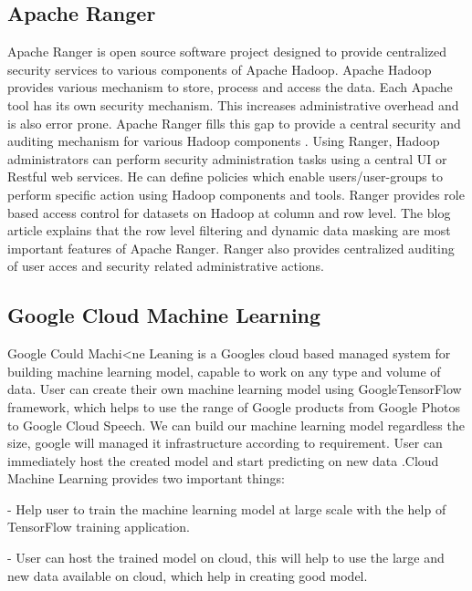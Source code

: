 {\subsection{Apache Ranger \cv}

     Apache Ranger \cite{www-apache-ranger} is open source software project
     designed to provide centralized security services to various components
     of Apache Hadoop. Apache Hadoop provides various mechanism to store,
     process and access the data. Each Apache tool has its own security
     mechanism. This increases administrative overhead and is also error
     prone.  Apache Ranger fills this gap to provide a central security and
     auditing mechanism for various Hadoop components
     \cite{www-ranger-architecture}. Using Ranger, Hadoop administrators can
     perform security administration tasks using a central UI or Restful web
     services. He can define policies which enable users/user-groups to
     perform specific action using Hadoop components and tools. Ranger
     provides role based access control for datasets on Hadoop at column and
     row level.  The blog article \cite{www-ranger-key-features} explains
     that the row level filtering and dynamic data masking are most important
     features of Apache Ranger. Ranger also provides centralized auditing of
     user acces and security related administrative actions.
     
\subsection{Google Cloud Machine Learning}
     
     Google Could Machi<ne Leaning is a Googles cloud based managed
     system for building machine learning model, capable to work on any
     type and volume of data. User can create their own machine learning
     model using GoogleTensorFlow framework, which helps to use the
     range of Google products from Google Photos to Google Cloud Speech.
     We can build our machine learning model regardless the size, google
     will managed it infrastructure according to  requirement. User can
     immediately host the created model and start predicting on new data
     \cite{www-googlecloudmachinelearning}.Cloud Machine Learning provides
     two important things:
     
     - Help user to train the machine learning model at large scale
       with the help of TensorFlow  training application.
	
     - User can host the trained model on cloud,  this will help
       to use the large and new data available on cloud, which help in
       creating good model.

}
